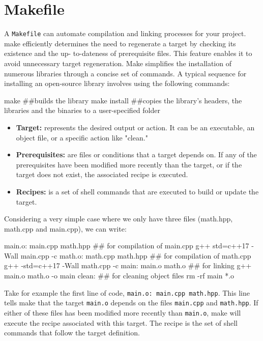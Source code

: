 \newpage
\section{Makefile}


A \texttt{Makefile} can automate compilation and linking processes for your project. make efficiently determines the need to regenerate a target by checking its existence and the up-
to-dateness of prerequisite files. This feature enables it to avoid unnecessary target regeneration.
Make simplifies the installation of numerous libraries through a concise set of commands. A typical
sequence for installing an open-source library involves using the following commands:

\begin{codeblock}[language=bash]
    make  ##builds the library
    make install   ##copies the library's headers, the libraries and the binaries to a user-specified folder
\end{codeblock}

\begin{itemize}
    \item \textbf{Target:} represents the desired output or action. It can be an executable, an
object file, or a specific action like "clean."
    \item \textbf{Prerequisites:} are files or conditions that a target depends on. If any of the prerequisites have
been modified more recently than the target, or if the target does not exist, the associated
recipe is executed.
    \item \textbf{Recipes:} is a set of shell commands that are executed to build or update the target.
\end{itemize}

Considering a very simple case where we only have three files (math.hpp, math.cpp and main.cpp), we can write:

\begin{codeblock}[language=bash]
main.o: main.cpp math.hpp   ## for compilation of main.cpp
    g++ std=c++17 -Wall main.cpp -c
math.o: math.cpp math.hpp   ## for compilation of math.cpp
    g++ -std=c++17 -Wall math.cpp -c
main: main.o math.o   ## for linking
    g++ main.o math.o -o main
clean:   ## for cleaning object files
    rm -rf main *.o
\end{codeblock}

Take for example the first line of code, \texttt{main.o: main.cpp math.hpp}. This line tells make that the target \texttt{main.o} depends on the files \texttt{main.cpp} and \texttt{math.hpp}. If either of these files has been modified more recently than \texttt{main.o}, make will execute the recipe associated with this target. The recipe is the set of shell commands that follow the target definition.

